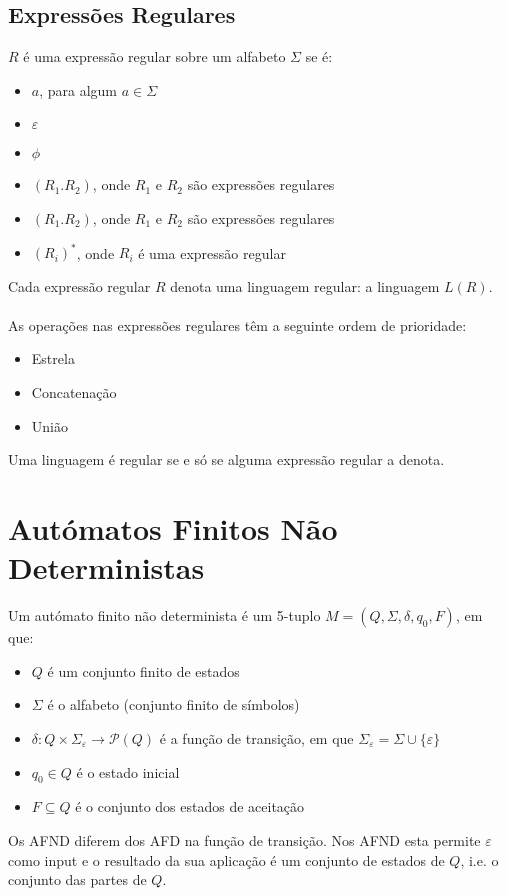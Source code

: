 \documentclass[10pt,a4paper]{report}
\begin{document}
\subsection{Expressões Regulares}
$R$ é uma expressão regular sobre um alfabeto $\Sigma$ se é:
\begin{itemize}
\item $a$, para algum $a \in \Sigma$
\item $\varepsilon$
\item $\phi$
\item $(R_1.R_2)$, onde $R_1$ e $R_2$ são expressões regulares
\item $(R_1.R_2)$, onde $R_1$ e $R_2$ são expressões regulares
\item $(R_i)^*$, onde $R_i$ é uma expressão regular
\end{itemize}
Cada expressão regular $R$ denota uma linguagem regular: a linguagem $L(R)$.\\
\\
As operações nas expressões regulares têm a seguinte ordem de prioridade:
\begin{itemize}
\item Estrela
\item Concatenação
\item União
\end{itemize}
Uma linguagem é regular se e só se alguma expressão regular a denota.

\section{Autómatos Finitos Não Deterministas}
Um autómato finito não determinista é um 5-tuplo $M = (Q,\Sigma,\delta,q_0,F)$, em que:
\begin{itemize}
\item $Q$ é um conjunto finito de estados
\item $\Sigma$ é o alfabeto (conjunto finito de símbolos)
\item $\delta: Q \times \Sigma_\varepsilon \rightarrow \mathcal{P}(Q)$ é a função de transição, em que $\Sigma_\varepsilon = \Sigma \cup \{\varepsilon\}$
\item $q_0 \in Q$ é o estado inicial
\item $F \subseteq Q$ é o conjunto dos estados de aceitação
\end{itemize}
Os AFND diferem dos AFD na função de transição. Nos AFND esta permite $\varepsilon$ como input e o resultado da sua aplicação é um conjunto de estados de $Q$, i.e. o conjunto das partes de $Q$.
\end{document}
